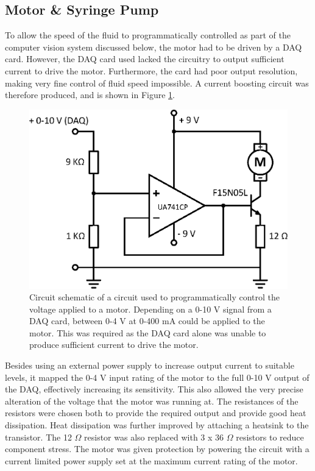 \documentclass{physics_article_B}
\begin{document}
    \subsection{Motor \& Syringe Pump\label{sect:method:motor}}

        To allow the speed of the fluid to programmatically controlled as part of the computer vision system discussed below, the motor had to be driven by a DAQ card. However, the DAQ card used lacked the circuitry to output sufficient current to drive the motor. Furthermore, the card had poor output resolution, making very fine control of fluid speed impossible. A current boosting circuit was therefore produced, and is shown in Figure \ref{fig:MotorCircuit}.  
        
            \begin{figure}[H]
                \centering
                \hspace*{-1.8cm}\includegraphics[scale=0.8]{Figures/MotorCircuit.eps}
                \caption{Circuit schematic of a circuit used to programmatically control the voltage applied to a motor. Depending on a 0-10 V signal from a DAQ card, between 0-4 V at 0-400 mA could be applied to the motor. This was required as the DAQ card alone was unable to produce sufficient current to drive the motor.}
                \label{fig:MotorCircuit}
            \end{figure}
        
        Besides using an external power supply to increase output current to suitable levels, it mapped the 0-4 V input rating of the motor to the full 0-10 V output of the DAQ, effectively increasing its sensitivity. This also allowed the very precise alteration of the voltage that the motor was running at. The resistances of the resistors were chosen both to provide the required output and provide good heat dissipation. Heat dissipation was further improved by attaching a heatsink to the transistor. The 12 $\Omega$ resistor was also replaced with 3 x 36 $\Omega$ resistors to reduce component stress. The motor was given protection by powering the circuit with a current limited power supply set at the maximum current rating of the motor. 
        
\end{document}
